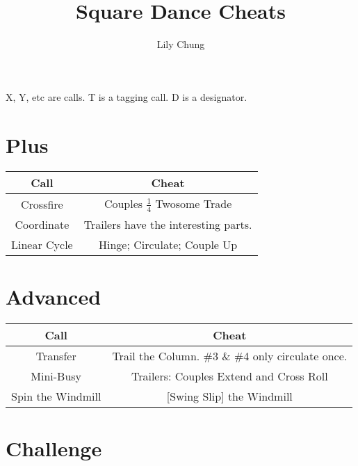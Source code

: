 \documentclass{article}
\title{Square Dance Cheats}
\author{Lily Chung}
\date{}
\begin{document}
\maketitle

X, Y, etc are calls.  T is a tagging call.  D is a designator.

\section*{Plus}

\begin{center}
  \begin{tabular}{c | c}
    Call & Cheat \\ \hline
    Crossfire & Couples $\frac14$ Twosome Trade \\
    Coordinate & Trailers have the interesting parts. \\
    Linear Cycle & Hinge; Circulate; Couple Up \\
  \end{tabular}
\end{center}

\section*{Advanced}

\begin{center}
  \begin{tabular}{c | c}
    Call & Cheat \\ \hline
    Transfer & Trail the Column.  \#3 \& \#4 only circulate once. \\
    Mini-Busy & Trailers: Couples Extend and Cross Roll \\
    Spin the Windmill & [Swing Slip] the Windmill \\
  \end{tabular}
\end{center}

\section*{Challenge}
\end{document}
